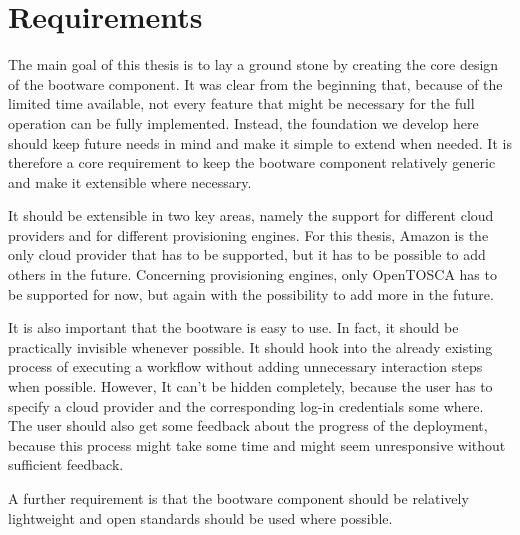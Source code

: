 \section{Requirements}

The main goal of this thesis is to lay a ground stone by creating the core design of the bootware component.
It was clear from the beginning that, because of the limited time available, not every feature that might be necessary for the full operation can be fully implemented.
Instead, the foundation we develop here should keep future needs in mind and make it simple to extend when needed.
It is therefore a core requirement to keep the bootware component relatively generic and make it extensible where necessary.

It should be extensible in two key areas, namely the support for different cloud providers and for different provisioning engines.
For this thesis, Amazon is the only cloud provider that has to be supported, but it has to be possible to add others in the future.
Concerning provisioning engines, only OpenTOSCA has to be supported for now, but again with the possibility to add more in the future.

It is also important that the bootware is easy to use.
In fact, it should be practically invisible whenever possible.
It should hook into the already existing process of executing a workflow without adding unnecessary interaction steps when possible.
However, It can't be hidden completely, because the user has to specify a cloud provider and the corresponding log-in credentials some where.
The user should also get some feedback about the progress of the deployment, because this process might take some time and might seem unresponsive without sufficient feedback.

A further requirement is that the bootware component should be relatively lightweight and open standards should be used where possible.

